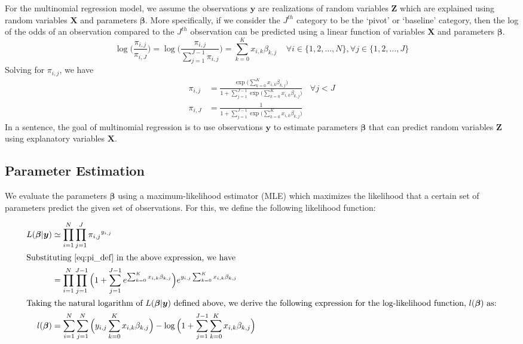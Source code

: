 \documentclass[12pt]{article}
\newcommand{\bS}[1] {\boldsymbol  #1}
\newcommand{\aI}{\forall i \in \{1,2,\ldots, N\}}
\newcommand{\aJ}{\forall j \in \{1,2,\ldots, J\}}
\begin{document}
For the multinomial regression model, we assume the observations $\bS{y}$ are realizations of random variables $\bS{Z}$ which are explained using random variables $\bS{X}$ and parameters $\bS{\beta}$. More specifically, if we consider the $J^{th}$ category to be the `pivot' or `baseline' category, then the log of the odds of an observation compared to the  $J^{th}$ observation can be predicted using a linear function of variables $\bS{X}$ and parameters $\bS{\beta}$.
\begin{equation}
 \log \Big( \frac{\pi_{i,j}}{\pi_{i,J}}\Big) =  \log \Big( \frac{\pi_{i,j}}{\sum_{j=1}^{J-1}\pi_{i,j}}\Big) = \sum_{k=0}^{K} x_{i,k}\beta_{k,j}  \ \ \ \ \ \aI, \aJ
\end{equation}
Solving for $\pi_{i,j}$, we have
\begin{subequations}
\label{eq:pi_def}
\begin{align}
\pi_{i,j} &= \frac{\exp \big( {\sum_{k=0}^{K} x_{i,k}\beta_{k,j}}\big)}{1 + \sum_{j=1}^{J-1}\exp{\big( \sum_{k=0}^{K} x_{i,k}\beta_{k,j}\big)}}\ \ \ \  \forall j < J\\
\pi_{i,J} &= \frac{1}{1 + \sum_{j=1}^{J-1}\exp{\big( \sum_{k=0}^{K} x_{i,k}\beta_{k,j}\big)}} 
\end{align}
\end{subequations}
In a sentence, the goal of multinomial regression is to use observations $\bS{y}$ to estimate parameters $\bS{\beta}$ that can predict random variables $\bS{Z}$ using explanatory variables $\bS{X}$. 

\subsection{Parameter Estimation}\label{sec:problem}
We evaluate the parameters $\bS{\beta}$ using a maximum-likelihood estimator (MLE) which maximizes the likelihood that a certain set of parameters predict the given set of observations. For this, we define the following likelihood function:

\begin{align}
L(\bS{\beta}|\bS{y}) &\simeq \prod_{i=1}^{N}\prod_{j=1}^{J}{\pi_{i,j}}^{y_{i,j}} \\
\intertext{Substituting \eqref{eq:pi_def} in the above expression, we have}
&= \prod_{i=1}^{N}\prod_{j=1}^{J-1} \Big( 1 + \sum_{j=1}^{J-1} e^{\sum_{k=0}^{K} x_{i,k}\beta_{k,j}} \Big)  e^{y_{i,j} \sum_{k=0}^{K} x_{i,k}\beta_{k,j}} \\
\intertext{Taking the natural logarithm of $L(\bS{\beta}|\bS{y})$ defined above, we derive the following expression for the log-likelihood function, $l(\bS{\beta})$ as:}
l(\bS{\beta}) &= \sum_{i=1}^{N}\sum_{j=1}^{N} \Big( y_{i,j} \sum_{k=0}^{K} x_{i,k}\beta_{k,j} \Big) - \log \Big( 1 + \sum_{j=1}^{J-1} \sum_{k=0}^{K} x_{i,k}\beta_{k,j}\Big) \label{eq:log_lik}
\end{align}
\end{document}
